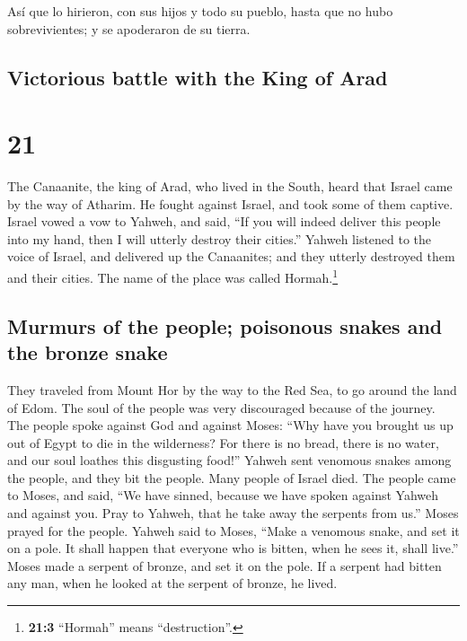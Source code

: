 \begin{paracol}{2}
 Así que lo hirieron, con sus hijos y todo su pueblo,
hasta que no hubo sobrevivientes; y se apoderaron de su tierra.

\switchcolumn
\begin{otherlanguage}{english}

\hypertarget{victorious-battle-with-the-king-of-arad}{%
\subsection{Victorious battle with the King of
Arad}\label{victorious-battle-with-the-king-of-arad}}

\hypertarget{section-41}{%
\section{21}\label{section-41}}

 The Canaanite, the king of Arad, who lived in the South,
heard that Israel came by the way of Atharim. He fought against Israel,
and took some of them captive.  Israel vowed a vow to
Yahweh, and said, ``If you will indeed deliver this people into my hand,
then I will utterly destroy their cities.''  Yahweh
listened to the voice of Israel, and delivered up the Canaanites; and
they utterly destroyed them and their cities. The name of the place was
called Hormah.\footnote{\textbf{21:3} ``Hormah'' means ``destruction''.}

\hypertarget{murmurs-of-the-people-poisonous-snakes-and-the-bronze-snake}{%
\subsection{Murmurs of the people; poisonous snakes and the bronze
snake}\label{murmurs-of-the-people-poisonous-snakes-and-the-bronze-snake}}

 They traveled from Mount Hor by the way to the Red Sea,
to go around the land of Edom. The soul of the people was very
discouraged because of the journey.  The people spoke
against God and against Moses: ``Why have you brought us up out of Egypt
to die in the wilderness? For there is no bread, there is no water, and
our soul loathes this disgusting food!''  Yahweh sent
venomous snakes among the people, and they bit the people. Many people
of Israel died.  The people came to Moses, and said, ``We
have sinned, because we have spoken against Yahweh and against you. Pray
to Yahweh, that he take away the serpents from us.'' Moses prayed for
the people.  Yahweh said to Moses, ``Make a venomous
snake, and set it on a pole. It shall happen that everyone who is
bitten, when he sees it, shall live.''  Moses made a
serpent of bronze, and set it on the pole. If a serpent had bitten any
man, when he looked at the serpent of bronze, he lived.


\end{otherlanguage}
\end{paracol}
